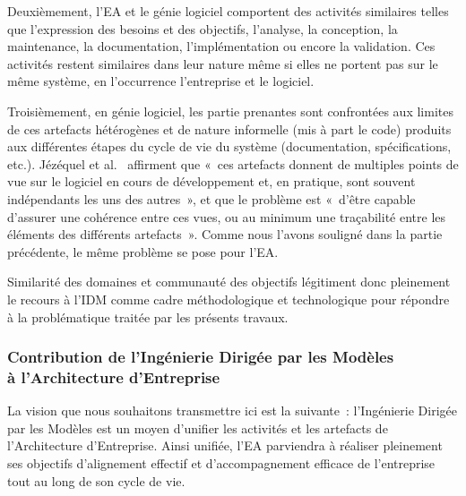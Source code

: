     Deuxièmement, l'EA et le génie logiciel comportent des activités
    similaires telles que l'expression des besoins et des objectifs, l'analyse,
    la conception, la maintenance, la documentation, l'implémentation ou encore
    la validation. Ces activités restent similaires dans leur nature même
    si elles ne portent pas sur le même système, en l'occurrence l'entreprise et
    le logiciel.

    Troisièmement, en génie logiciel, les partie prenantes sont
    confrontées aux limites de ces artefacts hétérogènes et de nature informelle (mis à
    part le code) produits aux différentes étapes du cycle de vie du système (documentation,
    spécifications, etc.). Jézéquel et al.~\cite{jezequel2006genie} affirment
    que «~ces artefacts donnent de multiples points de vue sur le
    logiciel en cours de développement et, en pratique, sont souvent
    indépendants les uns des autres~», et que le problème est «~d’être
    capable d'assurer une cohérence entre ces vues, ou au minimum une
    traçabilité entre les éléments des différents artefacts~».
    Comme nous l'avons souligné dans la partie précédente, le même problème se pose pour l'EA.


    Similarité des domaines et communauté des objectifs légitiment
    donc pleinement le recours à l'IDM comme cadre
    méthodologique et technologique pour répondre à la problématique traitée
    par les présents travaux.

    \subsubsection{Contribution de l'Ingénierie Dirigée par les Modèles\\à l'Architecture d'Entreprise}

    La vision que nous souhaitons transmettre ici est la suivante~:
    l'Ingénierie Dirigée par les Modèles est un moyen d'unifier les activités
    et les artefacts de l'Architecture d'Entreprise. Ainsi unifiée, l'EA parviendra à réaliser
    pleinement ses objectifs d'alignement effectif et d'accompagnement efficace de
    l'entreprise tout au long de son cycle de vie.

